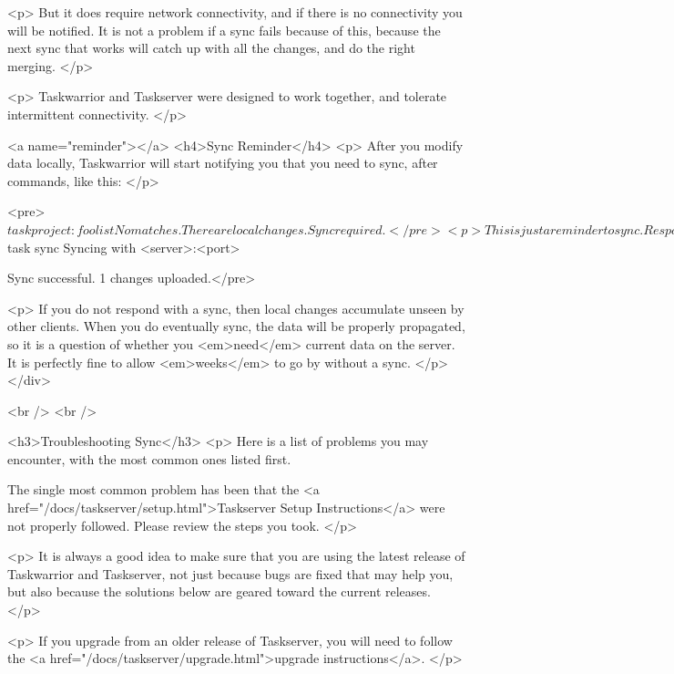 \documentclass[t,handout]{beamer}
\begin{document}
<p>
  But it does require network connectivity, and if there is no
  connectivity you will be notified.  It is not a problem if a sync
  fails because of this, because the next sync that works will
  catch up with all the changes, and do the right merging.
</p>

<p>
 Taskwarrior and Taskserver were designed to work together, and
 tolerate intermittent connectivity.
</p>

<a name="reminder"></a>
<h4>Sync Reminder</h4>
<p>
  After you modify data locally, Taskwarrior will start notifying
  you that you need to sync, after commands, like this:
</p>

<pre>$ task project:foo list
No matches.
There are local changes.  Sync required.</pre>

<p>
  This is just a reminder to sync. Respond with a sync, and the
  reminder goes away:
</p>

<pre>$ task sync
Syncing with <server>:<port>

Sync successful.  1 changes uploaded.</pre>

<p>
  If you do not respond with a sync, then local changes accumulate
  unseen by other clients. When you do eventually sync, the data
  will be properly propagated, so it is a question of whether you
  <em>need</em> current data on the server. It is perfectly fine
  to allow <em>weeks</em> to go by without a sync.
</p>
</div>

<br />
<br />


<h3>Troubleshooting Sync</h3>
<p>
  Here is a list of problems you may encounter, with the most common
  ones listed first.

  The single most common problem has been that the
  <a href="/docs/taskserver/setup.html">Taskserver Setup Instructions</a>
  were not properly followed.  Please review the steps you took.
</p>

<p>
  It is always a good idea to make sure that you are using the latest
  release of Taskwarrior and Taskserver, not just because bugs are
  fixed that may help you, but also because the solutions below are
  geared toward the current releases.
</p>

<p>
  If you upgrade from an older release of Taskserver, you will need
  to follow the
  <a href="/docs/taskserver/upgrade.html">upgrade instructions</a>.
</p>
\end{document}

